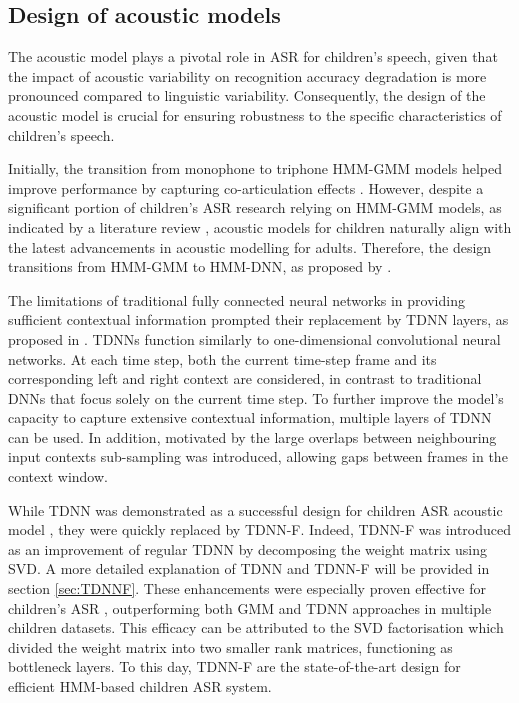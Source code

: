 \subsection{Design of acoustic models}%
The acoustic model plays a pivotal role in \ac{ASR} for children's speech, given that the impact of acoustic variability on recognition accuracy degradation is more pronounced compared to linguistic variability. Consequently, the design of the acoustic model is crucial for ensuring robustness to the specific characteristics of children's speech.

Initially, the transition from monophone to triphone \ac{HMM-GMM} models helped improve performance by capturing co-articulation effects \cite{potamianos1997automatic,language_children2}. However, despite a significant portion of children's \ac{ASR} research relying on \ac{HMM-GMM} models, as indicated by a literature review \cite{bhardwaj2022automatic}, acoustic models for children naturally align with the latest advancements in acoustic modelling for adults. Therefore, the design transitions from \ac{HMM-GMM} to \ac{HMM-DNN}, as proposed by \cite{TFchildren}.


The limitations of traditional fully connected neural networks in providing sufficient contextual information prompted their replacement by \ac{TDNN} layers, as proposed in \cite{tdnn}. \acp{TDNN} function similarly to one-dimensional convolutional neural networks. At each time step, both the current time-step frame and its corresponding left and right context are considered, in contrast to traditional \acp{DNN} that focus solely on the current time step. To further improve the model's capacity to capture extensive contextual information, multiple layers of \ac{TDNN} can be used. In addition, motivated by the large overlaps between neighbouring input contexts sub-sampling was introduced, allowing gaps between frames in the context window. 

While \ac{TDNN} was demonstrated as a successful design for children \ac{ASR} acoustic model  \cite{kumar2020leveraging}, they were quickly replaced by \ac{TDNN-F}. Indeed, \ac{TDNN-F} was introduced as an improvement of regular \ac{TDNN} \cite{TDNN-F} by decomposing the weight matrix using \ac{SVD}. A more detailed explanation of \ac{TDNN} and \ac{TDNN-F} will be provided in section \ref{sec:TDNNF}. These enhancements were especially proven effective for children's ASR \cite{tdnnf-children}, outperforming both \ac{GMM} and \ac{TDNN} approaches in multiple children datasets. This efficacy can be attributed to the \ac{SVD} factorisation which divided the weight matrix into two smaller rank matrices, functioning as bottleneck layers. To this day, \ac{TDNN-F} are the state-of-the-art design for efficient \ac{HMM}-based children \ac{ASR} system.

